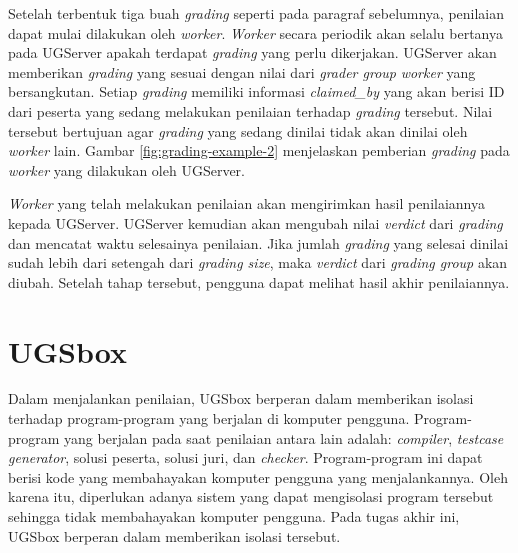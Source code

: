 \par Setelah terbentuk tiga buah \textit{grading} seperti pada paragraf sebelumnya, penilaian dapat mulai dilakukan oleh \textit{worker}. \textit{Worker} secara periodik akan selalu bertanya pada UGServer apakah terdapat \textit{grading} yang perlu dikerjakan. UGServer akan memberikan \textit{grading} yang sesuai dengan nilai dari \textit{grader group} \textit{worker} yang bersangkutan. Setiap \textit{grading} memiliki informasi \textit{claimed\_by} yang akan berisi ID dari peserta yang sedang melakukan penilaian terhadap \textit{grading} tersebut. Nilai tersebut bertujuan agar \textit{grading} yang sedang dinilai tidak akan dinilai oleh \textit{worker} lain. Gambar \ref{fig:grading-example-2} menjelaskan pemberian \textit{grading} pada \textit{worker} yang dilakukan oleh UGServer.

\par \textit{Worker} yang telah melakukan penilaian akan mengirimkan hasil penilaiannya kepada UGServer. UGServer kemudian akan mengubah nilai \textit{verdict} dari \textit{grading} dan mencatat waktu selesainya penilaian. Jika jumlah \textit{grading} yang selesai dinilai sudah lebih dari setengah dari \textit{grading size}, maka \textit{verdict} dari \textit{grading group} akan diubah. Setelah tahap tersebut, pengguna dapat melihat hasil akhir penilaiannya. 





\section{UGSbox}


\par Dalam menjalankan penilaian, UGSbox berperan dalam memberikan isolasi terhadap program-program yang berjalan di komputer pengguna. Program-program yang berjalan pada saat penilaian antara lain adalah: \textit{compiler}, \textit{testcase generator}, solusi peserta, solusi juri, dan \textit{checker}. Program-program ini dapat berisi kode yang membahayakan komputer pengguna yang menjalankannya. Oleh karena itu, diperlukan adanya sistem yang dapat mengisolasi program tersebut sehingga tidak membahayakan komputer pengguna. Pada tugas akhir ini, UGSbox berperan dalam memberikan isolasi tersebut.

